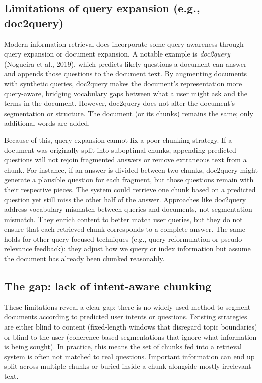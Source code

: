 \documentclass[12pt,a4paper]{report}
\begin{document}
\subsection{Limitations of query expansion (e.g., doc2query)}
Modern information retrieval does incorporate some query awareness through query expansion or document expansion. A notable example is \textit{doc2query} (Nogueira et al., 2019), which predicts likely questions a document can answer and appends those questions to the document text. By augmenting documents with synthetic queries, doc2query makes the document's representation more query-aware, bridging vocabulary gaps between what a user might ask and the terms in the document. However, doc2query does not alter the document's segmentation or structure. The document (or its chunks) remains the same; only additional words are added.

Because of this, query expansion cannot fix a poor chunking strategy. If a document was originally split into suboptimal chunks, appending predicted questions will not rejoin fragmented answers or remove extraneous text from a chunk. For instance, if an answer is divided between two chunks, doc2query might generate a plausible question for each fragment, but those questions remain with their respective pieces. The system could retrieve one chunk based on a predicted question yet still miss the other half of the answer. Approaches like doc2query address vocabulary mismatch between queries and documents, not segmentation mismatch. They enrich content to better match user queries, but they do not ensure that each retrieved chunk corresponds to a complete answer. The same holds for other query-focused techniques (e.g., query reformulation or pseudo-relevance feedback): they adjust how we query or index information but assume the document has already been chunked reasonably.

\subsection{The gap: lack of intent-aware chunking}
These limitations reveal a clear gap: there is no widely used method to segment documents according to predicted user intents or questions. Existing strategies are either blind to content (fixed-length windows that disregard topic boundaries) or blind to the user (coherence-based segmentations that ignore what information is being sought). In practice, this means the set of chunks fed into a retrieval system is often not matched to real questions. Important information can end up split across multiple chunks or buried inside a chunk alongside mostly irrelevant text.
\end{document}

